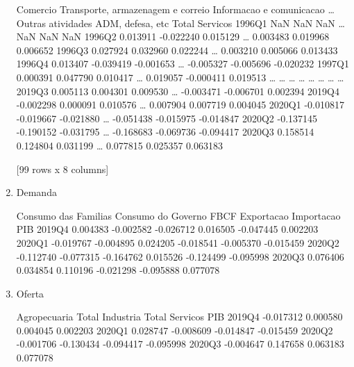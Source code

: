\documentclass[11pt]{article}
\begin{document}
\begin{enumerate}
        Comercio  Transporte, armazenagem e correio  Informacao e comunicacao  \ldots{}  Outras atividades  ADM, defesa, etc  Total Servicos
1996Q1       NaN                                NaN                       NaN  \ldots{}                NaN               NaN             NaN
1996Q2  0.013911                          -0.022240                  0.015129  \ldots{}           0.003483          0.019968        0.006652
1996Q3  0.027924                           0.032960                  0.022244  \ldots{}           0.003210          0.005066        0.013433
1996Q4  0.013407                          -0.039419                 -0.001653  \ldots{}          -0.005327         -0.005696       -0.020232
1997Q1  0.000391                           0.047790                  0.010417  \ldots{}           0.019057         -0.000411        0.019513
\ldots{}          \ldots{}                                \ldots{}                       \ldots{}  \ldots{}                \ldots{}               \ldots{}             \ldots{}
2019Q3  0.005113                           0.004301                  0.009530  \ldots{}          -0.003471         -0.006701        0.002394
2019Q4 -0.002298                           0.000091                  0.010576  \ldots{}           0.007904          0.007719        0.004045
2020Q1 -0.010817                          -0.019667                 -0.021880  \ldots{}          -0.051438         -0.015975       -0.014847
2020Q2 -0.137145                          -0.190152                 -0.031795  \ldots{}          -0.168683         -0.069736       -0.094417
2020Q3  0.158514                           0.124804                  0.031199  \ldots{}           0.077815          0.025357        0.063183

[99 rows x 8 columns]

\item Demanda
\label{sec:org8e4e26a}

        Consumo das Familias  Consumo do Governo      FBCF  Exportacao  Importacao       PIB
2019Q4              0.004383           -0.002582 -0.026712    0.016505   -0.047445  0.002203
2020Q1             -0.019767           -0.004895  0.024205   -0.018541   -0.005370 -0.015459
2020Q2             -0.112740           -0.077315 -0.164762    0.015526   -0.124499 -0.095998
2020Q3              0.076406            0.034854  0.110196   -0.021298   -0.095888  0.077078

\item Oferta
\label{sec:orgce7953d}


        Agropecuaria  Total Industria  Total Servicos       PIB
2019Q4     -0.017312         0.000580        0.004045  0.002203
2020Q1      0.028747        -0.008609       -0.014847 -0.015459
2020Q2     -0.001706        -0.130434       -0.094417 -0.095998
2020Q3     -0.004647         0.147658        0.063183  0.077078
\end{enumerate}
\end{document}
